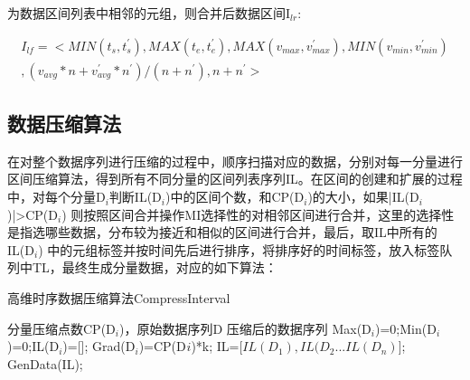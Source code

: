 为数据区间列表中相邻的元组，则合并后数据区间I$_{lr}$:

\begin{equation}
\begin{split}
I_{lf}=<MIN(t_{s},t_{s}^{'}),MAX(t_{e},t_{e}^{'}),MAX(v_{max},v_{max}^{'}),MIN(v_{min},v_{min}^{'})\\
,(v_{avg}*n+v_{avg}^{'}*n^{'})/(n+n^{'}),n+n^{'}>
\end{split}
\end{equation}


\subsection{数据压缩算法}
\label{3.14}
在对整个数据序列进行压缩的过程中，顺序扫描对应的数据，分别对每一分量进行区间压缩算法，得到所有不同分量的区间列表序列IL。在区间的创建和扩展的过程
中，对每个分量D$_{i}$判断IL(D$_{i}$)中的区间个数，和CP(D$_{i}$)的大小，如果|IL(D$_{i}$)|>CP(D$_{i}$)
则按照区间合并操作MI选择性的对相邻区间进行合并，这里的选择性是指选哪些数据，分布较为接近和相似的区间进行合并，最后，取IL中所有的IL(D$_{i}$)
中的元组标签并按时间先后进行排序，将排序好的时间标签，放入标签队列中TL，最终生成分量数据，对应的如下算法：
\newpage


\begin{algorithm}
\caption{高维时序数据压缩算法CompressInterval}
\label{alg1}
\begin{algorithmic}[1]
\REQUIRE 分量压缩点数CP(D$_{i}$)，原始数据序列D 
\ENSURE 压缩后的数据序列
\STATE Max(D$_{i}$)=0;Min(D$_{i}$)=0;IL(D$_{i}$)=[];
\STATE Grad(D$_{i}$)=CP(D$_{}i$)*k;
\ENDFOR
{}
\ENDWHILE
\STATE IL=[$ IL(D_{1}),IL(D_{2}...IL(D_{n}) $];
\RETURN GenData(IL);
\end{algorithmic}
\end{algorithm}


